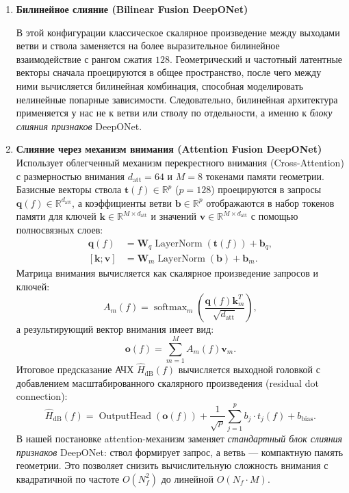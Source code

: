 \begin{enumerate}
    \item \textbf{Билинейное слияние (Bilinear Fusion DeepONet)}~\cite{kim2016hadamard}
    
    В этой конфигурации классическое скалярное произведение между выходами ветви и ствола заменяется на более выразительное билинейное взаимодействие с рангом сжатия $128$. Геометрический и частотный латентные векторы сначала проецируются в общее пространство, после чего между ними вычисляется билинейная комбинация, способная моделировать нелинейные попарные зависимости. Следовательно, билинейная архитектура применяется у нас не к ветви или стволу по отдельности, а именно к \emph{блоку слияния признаков} DeepONet.
    
    \item \textbf{Слияние через механизм внимания (Attention Fusion DeepONet)}~\cite{vaswani2017attention}
    Использует облегченный механизм перекрестного внимания (Cross-Attention) с размерностью внимания $d_{\mathrm{att}} = 64$ и $M = 8$ токенами памяти геометрии. Базисные векторы ствола $\mathbf{t}(f) \in \mathbb{R}^p$ ($p=128$) проецируются в запросы $\mathbf{q}(f) \in \mathbb{R}^{d_{\mathrm{att}}}$, а коэффициенты ветви $\mathbf{b} \in \mathbb{R}^p$ отображаются в набор токенов памяти для ключей $\mathbf{k} \in \mathbb{R}^{M \times d_{\mathrm{att}}}$ и значений $\mathbf{v} \in \mathbb{R}^{M \times d_{\mathrm{att}}}$ с помощью полносвязных слоев:
    \begin{align}
        \mathbf{q}(f) &= \mathbf{W}_q \operatorname{LayerNorm}(\mathbf{t}(f)) + \mathbf{b}_q, \\
        [\mathbf{k}; \mathbf{v}] &= \mathbf{W}_m \operatorname{LayerNorm}(\mathbf{b}) + \mathbf{b}_m.
    \end{align}
    Матрица внимания вычисляется как скалярное произведение запросов и ключей:
    \begin{equation}
        A_m(f) = \operatorname{softmax}_m \left( \frac{\mathbf{q}(f) \mathbf{k}_m^T}{\sqrt{d_{\mathrm{att}}}} \right),
    \end{equation}
    а результирующий вектор внимания имеет вид:
    \begin{equation}
        \mathbf{o}(f) = \sum_{m=1}^M A_m(f) \mathbf{v}_m.
    \end{equation}
    Итоговое предсказание АЧХ $\widehat{H}_{\mathrm{dB}}(f)$ вычисляется выходной головкой с добавлением масштабированного скалярного произведения (residual dot connection):
    \begin{equation}
        \widehat{H}_{\mathrm{dB}}(f) = \operatorname{OutputHead}(\mathbf{o}(f)) + \frac{1}{\sqrt{p}} \sum_{j=1}^p b_j \cdot t_j(f) + b_{\mathrm{bias}}.
    \end{equation}
    В нашей постановке attention-механизм заменяет \emph{стандартный блок слияния признаков} DeepONet: ствол формирует запрос, а ветвь --- компактную память геометрии. Это позволяет снизить вычислительную сложность внимания с квадратичной по частоте $O(N_f^2)$ до линейной $O(N_f \cdot M)$.
    

\end{enumerate}
